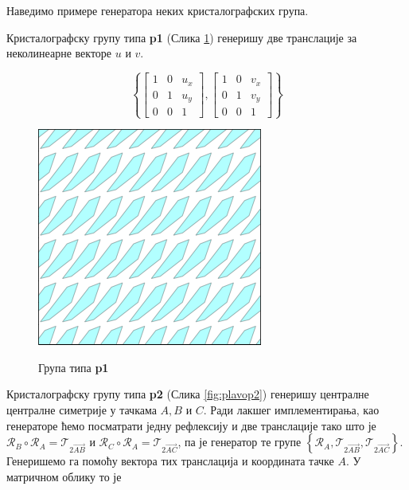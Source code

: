 \documentclass[12pt]{report}
\begin{document}
Наведимо примере генератора неких кристалографских група.





Кристалографску групу типа \textbf{p1}  (Слика \ref{fig:plavop1}) генеришу две транслације за неколинеарне векторе ${u}$ и ${v}$.

$$\left\{\begin{bmatrix}1 & 0 & u_x\\ 0 & 1&u_y \\ 0 & 0 & 1\end{bmatrix},  \begin{bmatrix}1 & 0 & v_x\\ 0 & 1&v_y \\ 0 & 0 & 1\end{bmatrix}\right\} $$

\begin{figure}[H]
\centering
    \includegraphics[width=.3\textwidth]{plavo_p1.png}
    \label{fig:plavop1}
    \caption{Група типа \textbf{p1}}
  \end{figure}



Кристалографску групу типа \textbf{p2} (Слика \ref{fig:plavop2}) генеришу централне централне симетрије у тачкама $A,B$ и $C$. Ради лакшег имплементирања, као генераторе ћемо посматрати једну рефлексију и две транслације тако што је $\mathcal{R}_B \circ \mathcal{R}_A = \mathcal{T}_{2\vec{AB}} $ и $\mathcal{R}_C \circ \mathcal{R}_A = \mathcal{T}_{2\vec{AC}} $, па је генератор те групе $\left\{ \mathcal{R}_A , \mathcal{T}_{2\vec{AB}}, \mathcal{T}_{2\vec{AC}} \right\} $.  Генеришемо га помоћу вектора тих транслација и координата тачке $A$. У матричном облику то је 
\end{document}
